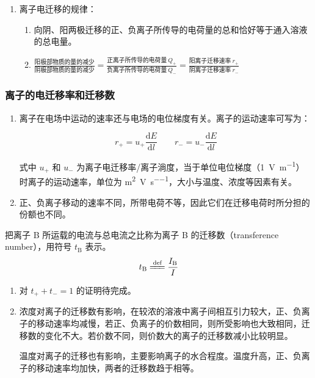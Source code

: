 \begin{enumerate}
    \item 离子电迁移的规律：
    \begin{enumerate}
        \item 向阴、阳两极迁移的正、负离子所传导的电荷量的总和恰好等于通入溶液的总电量。
        \item $\displaystyle \frac{\text{阳极部物质的量的减少}}{\text{阴极部物质的量的减少}} = \frac{\text{正离子所传导的电荷量} \ Q_+}{\text{负离子所传导的电荷量} \ Q_-} = \frac{\text{阳离子迁移速率} \ r_+}{\text{阴离子迁移速率} \ r_-}$
    \end{enumerate}
\end{enumerate}

\subsubsection{离子的电迁移率和迁移数}

\begin{enumerate}
    \item 离子在电场中运动的速率还与电场的电位梯度有关。离子的运动速率可写为：
    
    \begin{equation}
        r_{+} = u_{+} \frac{\mathrm{d}E}{\mathrm{d}l} \qquad r_{-} = u_{-} \frac{\mathrm{d}E}{\mathrm{d}l}
    \end{equation}

    式中 $u_{+}$ 和 $u_{-}$ 为离子电迁移率/离子淌度，当于单位电位梯度（\qty{1}{\volt\per\meter}）时离子的运动速率，单位为 \si{\meter\squared\per\volt\per\second}，大小与温度、浓度等因素有关。

    \item 正、负离子移动的速率不同，所带电荷不等，因此它们在迁移电荷时所分担的份额也不同。
\end{enumerate}

\begin{definition}
    把离子 B 所运载的电流与总电流之比称为离子 B 的迁移数（transference number），用符号 $t_{\mathrm{B}}$ 表示。
    \begin{equation}
        t_{\mathrm{B}} \xlongequal{\text{def}} \frac{I_{\mathrm{B}}}{I}
    \end{equation}
\end{definition}

\begin{enumerate}[resume]
    \item 对 $t_+ + t_- = 1$ 的证明待完成。
    \item 浓度对离子的迁移数有影响，在较浓的溶液中离子间相互引力较大，正、负离子的移动速率均减慢，若正、负离子的价数相同，则所受影响也大致相同，迁移数的变化不大。若价数不同，则价数大的离子的迁移数减小比较明显。
    
    温度对离子的迁移也有影响，主要影响离子的水合程度。温度升高，正、负离子的移动速率均加快，两者的迁移数趋于相等。
\end{enumerate}

